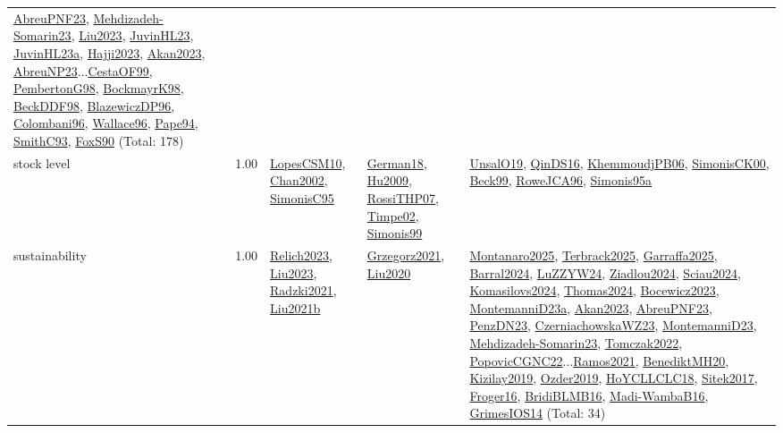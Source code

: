 {\begin{longtable}{p{3cm}r>{\raggedright\arraybackslash}p{6cm}>{\raggedright\arraybackslash}p{6cm}>{\raggedright\arraybackslash}p{8cm}}
\hyperref[detail:AbreuPNF23]{AbreuPNF23}, \hyperref[detail:Mehdizadeh-Somarin23]{Mehdizadeh-Somarin23}, \hyperref[detail:Liu2023]{Liu2023}, \hyperref[detail:JuvinHL23]{JuvinHL23}, \hyperref[detail:JuvinHL23a]{JuvinHL23a}, \hyperref[detail:Hajji2023]{Hajji2023}, \hyperref[detail:Akan2023]{Akan2023}, \hyperref[detail:AbreuNP23]{AbreuNP23}...\hyperref[detail:CestaOF99]{CestaOF99}, \hyperref[detail:PembertonG98]{PembertonG98}, \hyperref[detail:BockmayrK98]{BockmayrK98}, \hyperref[detail:BeckDDF98]{BeckDDF98}, \hyperref[detail:BlazewiczDP96]{BlazewiczDP96}, \hyperref[detail:Colombani96]{Colombani96}, \hyperref[detail:Wallace96]{Wallace96}, \hyperref[detail:Pape94]{Pape94}, \hyperref[detail:SmithC93]{SmithC93}, \hyperref[detail:FoxS90]{FoxS90} (Total: 178)\\
\index{stock level}\index{Concepts!stock level}stock level &  1.00 & \hyperref[detail:LopesCSM10]{LopesCSM10}, \hyperref[detail:Chan2002]{Chan2002}, \hyperref[detail:SimonisC95]{SimonisC95} & \hyperref[detail:German18]{German18}, \hyperref[detail:Hu2009]{Hu2009}, \hyperref[detail:RossiTHP07]{RossiTHP07}, \hyperref[detail:Timpe02]{Timpe02}, \hyperref[detail:Simonis99]{Simonis99} & \hyperref[detail:UnsalO19]{UnsalO19}, \hyperref[detail:QinDS16]{QinDS16}, \hyperref[detail:KhemmoudjPB06]{KhemmoudjPB06}, \hyperref[detail:SimonisCK00]{SimonisCK00}, \hyperref[detail:Beck99]{Beck99}, \hyperref[detail:RoweJCA96]{RoweJCA96}, \hyperref[detail:Simonis95a]{Simonis95a}\\
\index{sustainability}\index{Concepts!sustainability}sustainability &  1.00 & \hyperref[detail:Relich2023]{Relich2023}, \hyperref[detail:Liu2023]{Liu2023}, \hyperref[detail:Radzki2021]{Radzki2021}, \hyperref[detail:Liu2021b]{Liu2021b} & \hyperref[detail:Grzegorz2021]{Grzegorz2021}, \hyperref[detail:Liu2020]{Liu2020} & \hyperref[detail:Montanaro2025]{Montanaro2025}, \hyperref[detail:Terbrack2025]{Terbrack2025}, \hyperref[detail:Garraffa2025]{Garraffa2025}, \hyperref[detail:Barral2024]{Barral2024}, \hyperref[detail:LuZZYW24]{LuZZYW24}, \hyperref[detail:Ziadlou2024]{Ziadlou2024}, \hyperref[detail:Sciau2024]{Sciau2024}, \hyperref[detail:Komasilovs2024]{Komasilovs2024}, \hyperref[detail:Thomas2024]{Thomas2024}, \hyperref[detail:Bocewicz2023]{Bocewicz2023}, \hyperref[detail:MontemanniD23a]{MontemanniD23a}, \hyperref[detail:Akan2023]{Akan2023}, \hyperref[detail:AbreuPNF23]{AbreuPNF23}, \hyperref[detail:PenzDN23]{PenzDN23}, \hyperref[detail:CzerniachowskaWZ23]{CzerniachowskaWZ23}, \hyperref[detail:MontemanniD23]{MontemanniD23}, \hyperref[detail:Mehdizadeh-Somarin23]{Mehdizadeh-Somarin23}, \hyperref[detail:Tomczak2022]{Tomczak2022}, \hyperref[detail:PopovicCGNC22]{PopovicCGNC22}...\hyperref[detail:Ramos2021]{Ramos2021}, \hyperref[detail:BenediktMH20]{BenediktMH20}, \hyperref[detail:Kizilay2019]{Kizilay2019}, \hyperref[detail:Ozder2019]{Ozder2019}, \hyperref[detail:HoYCLLCLC18]{HoYCLLCLC18}, \hyperref[detail:Sitek2017]{Sitek2017}, \hyperref[detail:Froger16]{Froger16}, \hyperref[detail:BridiBLMB16]{BridiBLMB16}, \hyperref[detail:Madi-WambaB16]{Madi-WambaB16}, \hyperref[detail:GrimesIOS14]{GrimesIOS14} (Total: 34)\\

\end{longtable}}
